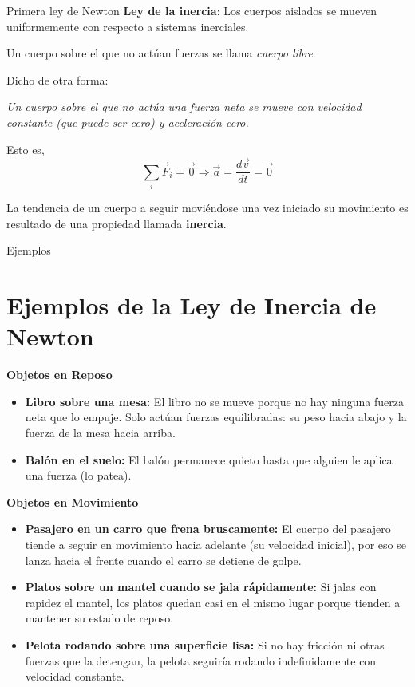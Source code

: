 \begin{frame}{Primera ley de Newton}
    \textbf{Ley de la inercia}: Los cuerpos aislados se mueven
uniformemente con respecto a sistemas inerciales.

\vspace{1em}

Un cuerpo sobre el que no actúan fuerzas se llama \emph{cuerpo libre}.

\vspace{1em}

Dicho de otra forma:
\begin{center}
    \textit{Un cuerpo sobre el que no actúa una fuerza neta se mueve con velocidad constante (que puede ser cero) y aceleración cero.}
\end{center}
\vspace{1em}

Esto es, \begin{equation*}
    \sum_i\vec{F}_i=\vec{0}\Rightarrow\vec{a}=\frac{d\vec{v}}{dt}=\vec{0}
\end{equation*}

La tendencia de un cuerpo a seguir moviéndose una vez iniciado su movimiento es resultado de una propiedad llamada \textbf{inercia}.

\end{frame}

\begin{frame}{Ejemplos}
    \section*{Ejemplos de la Ley de Inercia de Newton}

\textbf{Objetos en Reposo}
\begin{itemize}
    \item \textbf{Libro sobre una mesa:} El libro no se mueve porque no hay ninguna fuerza neta que lo empuje. Solo actúan fuerzas equilibradas: su peso hacia abajo y la fuerza de la mesa hacia arriba.
    \item \textbf{Balón en el suelo:} El balón permanece quieto hasta que alguien le aplica una fuerza (lo patea).
\end{itemize}

\textbf{Objetos en Movimiento}
\begin{itemize}
    \item \textbf{Pasajero en un carro que frena bruscamente:} El cuerpo del pasajero tiende a seguir en movimiento hacia adelante (su velocidad inicial), por eso se lanza hacia el frente cuando el carro se detiene de golpe.
    \item \textbf{Platos sobre un mantel cuando se jala rápidamente:} Si jalas con rapidez el mantel, los platos quedan casi en el mismo lugar porque tienden a mantener su estado de reposo.
    \item \textbf{Pelota rodando sobre una superficie lisa:} Si no hay fricción ni otras fuerzas que la detengan, la pelota seguiría rodando indefinidamente con velocidad constante.
\end{itemize}

\end{frame}

